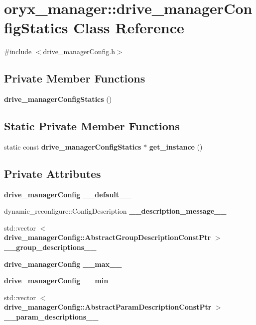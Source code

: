 \section{oryx\-\_\-manager\-:\-:drive\-\_\-manager\-Config\-Statics \-Class \-Reference}
\label{classoryx__manager_1_1drive__managerConfigStatics}


{\ttfamily \#include $<$drive\-\_\-manager\-Config.\-h$>$}

\subsection*{\-Private \-Member \-Functions}
\begin{DoxyCompactItemize}
\item 
{\bf drive\-\_\-manager\-Config\-Statics} ()
\end{DoxyCompactItemize}
\subsection*{\-Static \-Private \-Member \-Functions}
\begin{DoxyCompactItemize}
\item 
static const \*
{\bf drive\-\_\-manager\-Config\-Statics} $\ast$ {\bf get\-\_\-instance} ()
\end{DoxyCompactItemize}
\subsection*{\-Private \-Attributes}
\begin{DoxyCompactItemize}
\item 
{\bf drive\-\_\-manager\-Config} {\bf \-\_\-\-\_\-default\-\_\-\-\_\-}
\item 
dynamic\-\_\-reconfigure\-::\-Config\-Description {\bf \-\_\-\-\_\-description\-\_\-message\-\_\-\-\_\-}
\item 
std\-::vector\*
$<$ {\bf drive\-\_\-manager\-Config\-::\-Abstract\-Group\-Description\-Const\-Ptr} $>$ {\bf \-\_\-\-\_\-group\-\_\-descriptions\-\_\-\-\_\-}
\item 
{\bf drive\-\_\-manager\-Config} {\bf \-\_\-\-\_\-max\-\_\-\-\_\-}
\item 
{\bf drive\-\_\-manager\-Config} {\bf \-\_\-\-\_\-min\-\_\-\-\_\-}
\item 
std\-::vector\*
$<$ {\bf drive\-\_\-manager\-Config\-::\-Abstract\-Param\-Description\-Const\-Ptr} $>$ {\bf \-\_\-\-\_\-param\-\_\-descriptions\-\_\-\-\_\-}
\end{DoxyCompactItemize}
